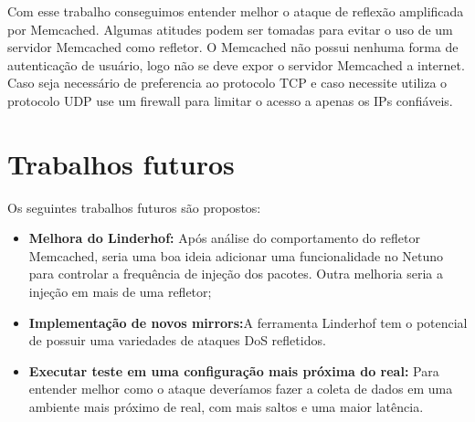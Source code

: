 Com esse trabalho conseguimos entender melhor o ataque de reflexão amplificada por Memcached. Algumas atitudes podem ser tomadas para evitar o uso de um servidor Memcached como refletor. O Memcached não possui nenhuma forma de autenticação de usuário, logo não se deve expor o servidor Memcached a internet. Caso seja necessário de preferencia ao protocolo TCP e caso necessite utiliza o protocolo UDP use um firewall para limitar o acesso a apenas os IPs confiáveis.

\section{Trabalhos futuros}

Os seguintes trabalhos futuros são propostos:

\begin{itemize}
    \item \textbf{Melhora do Linderhof:} 
    Após análise do comportamento do refletor Memcached, seria uma boa ideia adicionar uma funcionalidade no Netuno para controlar a frequência de injeção dos pacotes. Outra melhoria seria a injeção em mais de uma refletor;
    \item \textbf{Implementação de novos mirrors:}A ferramenta Linderhof tem o potencial de possuir uma variedades de ataques DoS refletidos.
    \item \textbf{Executar teste em uma configuração mais próxima do real:} Para entender melhor como o ataque deveríamos fazer a coleta de dados em uma ambiente mais próximo de real, com mais saltos e uma maior latência.  
\end{itemize}

